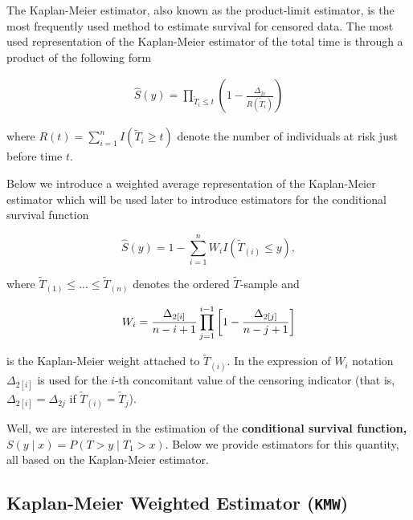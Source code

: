\documentclass[]{book}
\theoremstyle{definition}
\theoremstyle{definition}
\theoremstyle{definition}
\theoremstyle{remark}
\begin{document}
The Kaplan-Meier estimator, also known as the product-limit estimator,
is the most frequently used method to estimate survival for censored
data. The most used representation of the Kaplan-Meier estimator of the
total time is through a product of the following form

\begin{eqnarray*}
\widehat S(y)=\prod_{\widetilde T_i\leq t}\left(1-\frac{\Delta_{2i}}{R(\widetilde T_i)}\right)
\end{eqnarray*}

\noindent where \(R(t)=\sum_{i=1}^{n} I(\widetilde T_i \geq t)\) denote
the number of individuals at risk just before time \(t\).

Below we introduce a weighted average representation of the Kaplan-Meier
estimator which will be used later to introduce estimators for the
conditional survival function

\begin{equation*}
\widehat S(y)=1-\sum_{i=1}^{n}W_{i}I(\widetilde T_{(i)}\leq y),%
\end{equation*}

\noindent where
\(\widetilde T_{\left( 1\right) }\leq ...\leq \widetilde T_{\left( n\right) }\)
denotes the ordered \(\widetilde T\)-sample and

\begin{equation*}
W_{i}=\frac{\Delta_{2\left[ i\right] }}{n-i+1}\prod_{j=1}^{i-1}\left[ 1-\frac{%
\Delta _{2\left[ j\right] }}{n-j+1}\right]
\end{equation*}

\noindent is the Kaplan-Meier weight attached to
\(\widetilde T_{\left( i\right) }\). In the expression of \(W_{i}\)
notation \(\Delta_{2\left[ i\right] }\) is used for the \(i\)-th
concomitant value of the censoring indicator (that is,
\(\Delta_{2\left[ i \right] }=\Delta _{2j}\) if
\(\widetilde T_{\left( i\right) }=\widetilde T_{j}\)).

Well, we are interested in the estimation of the \textbf{conditional
survival function, \(S(y\mid x)=P(T>y\mid T_1>x)\)}. Below we provide
estimators for this quantity, all based on the Kaplan-Meier estimator.

\subsection{\texorpdfstring{Kaplan-Meier Weighted Estimator
(\texttt{KMW})}{Kaplan-Meier Weighted Estimator (KMW)}}\label{kaplan-meier-weighted-estimator-kmw}
\end{document}
